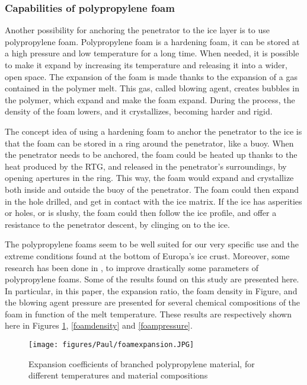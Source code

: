 
\subsubsection{Capabilities of polypropylene foam}

Another possibility for anchoring the penetrator to the ice layer is to use polypropylene foam. Polypropylene foam is a hardening foam, it can be stored at a high pressure and low temperature for a long time. When needed, it is possible to make it expand by increasing its temperature and releasing it into a wider, open space. The expansion of the foam is made thanks to the expansion of a gas contained in the polymer melt. This gas, called blowing agent, creates bubbles in the polymer, which expand and make the foam expand. During the process, the density of the foam lowers, and it crystallizes, becoming harder and rigid.

The concept idea of using a hardening foam to anchor the penetrator to the ice is that the foam can be stored in a ring around the penetrator, like a buoy. When the penetrator needs to be anchored, the foam could be heated up thanks to the heat produced by the RTG, and released in the penetrator's surroundings, by opening apertures in the ring. This way, the foam would expand and crystallize both inside and outside the buoy of the penetrator. The foam could then expand in the hole drilled, and get in contact with the ice matrix. If the ice has asperities or holes, or is slushy, the foam could then follow the ice profile, and offer a resistance to the penetrator descent, by clinging on to the ice.

The polypropylene foams seem to be well suited for our very specific use and the extreme conditions found at the bottom of Europa's ice crust. Moreover, some research has been done in \cite{naguib2002strategies}, to improve drastically some parameters of polypropylene foams. Some of the results found on this study are presented here. In particular, in this paper, the expansion ratio, the foam density in Figure, and the blowing agent pressure are presented for several chemical compositions of the foam in function of the melt temperature. These results are respectively shown here in Figures \ref{foamexpansion}, \ref{foamdensity} and \ref{foampressure}.

\begin{figure}[H]
\begin{center}
\texttt{[image: figures/Paul/foamexpansion.JPG]}
\end{center}
\caption{Expansion coefficients of branched polypropylene material, for different temperatures and material compositions}
\label{foamexpansion}
\end{figure}

